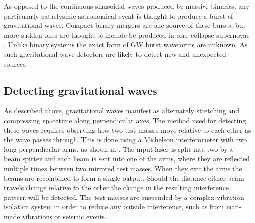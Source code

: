 \begin{colsection}
\begin{colsection}
As opposed to the continuous sinusoidal waves produced by massive binaries, any particularly cataclysmic astronomical event is thought to produce a burst of gravitational waves. Compact binary mergers are one source of these bursts, but more sudden ones are thought to include be produced in core-collapse supernovae \citep{GW-supernovae}. Unlike binary systems the exact form of GW burst waveforms are unknown. As such gravitational wave detectors are likely to detect new and unexpected sources.

\end{colsection}

\newpage
\subsection{Detecting gravitational waves}
\label{sec:gw_detecting}
\begin{colsection}

As described above, gravitational waves manifest as alternately stretching and compressing spacetime along perpendicular axes. The method used for detecting these waves requires observing how two test masses move relative to each other as the wave passes through. This is done using a Michelson interferometer with two long perpendicular arms, as shown in  \citep{BIGbirmingham}. The input laser is split into two by a beam spitter and each beam is sent into one of the arms, where they are reflected multiple times between two mirrored test masses. When they exit the arms the beams are recombined to form a single output. Should the distance either beam travels change relative to the other the change in the resulting interference pattern will be detected. The test masses are suspended by a complex vibration isolation system in order to reduce any outside interference, such as from man-made vibrations or seismic events.


\end{colsection}
\end{colsection}
